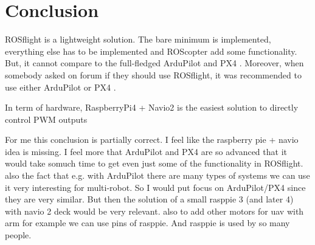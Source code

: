 \section{Conclusion}
ROSflight is a lightweight solution. The bare minimum is implemented, everything else has to be implemented and ROScopter add some functionality. But, it cannot compare to the full-fledged ArduPilot and PX4 \cite{reddit_firmware_ros}. Moreover, when somebody asked on forum if they should use ROSflight, it was recommended to use either ArduPilot or PX4 \cite{reddit_swarm_ros}.

In term of hardware, RaspberryPi4 + Navio2 is the easiest solution to directly control PWM outputs

    {\color{red}For me this conclusion is partially correct. I feel like the raspberry pie + navio idea is missing. }
    {\color{red}I feel more that ArduPilot and PX4 are so advanced that it would take somuch time to get even just some of the functionality in ROSflight. also the fact that e.g. with ArduPilot there are many types of systems we can use it very interesting for multi-robot. So I would put focus on ArduPilot/PX4 since they are very similar. But then the solution of a small rasppie 3 (and later 4) with navio 2 deck would be very relevant. also to add other motors for uav with arm for example we can use pins of rasppie. And rasppie is used by so many people.}
